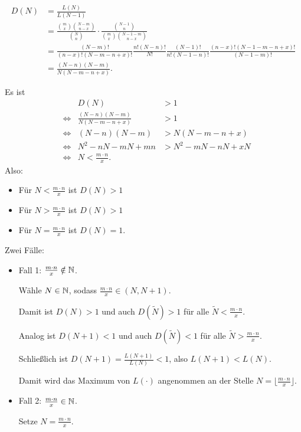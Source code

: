 \documentclass{tstextbook}
\begin{document}
\begin{example}
	\[
	\begin{aligned}
		D(N) & = \frac{L(N)}{L(N-1)} \\
		& = \frac{\binom{m}{x}\binom{N-m}{n-x}}{\binom{N}{n}} \cdot \frac{\binom{N-1}{n}}{\binom{m}{x}\binom{N-1-m}{n-x}} \\
		& = \frac{(N-m)!}{(n-x)!(N-m-n+x)!}\frac{n!(N-n)!}{N!}\frac{(N-1)!}{n!(N-1-n)!}\frac{(n-x)!(N-1-m-n+x)!}{(N-1-m)!} \\
		& = \frac{(N-n)(N-m)}{N(N-m-n+x)}.
	\end{aligned}
	\]
	
	Es ist 
	\[
	\begin{aligned}
		&& D(N) & > 1 \\
		& \Leftrightarrow & \frac{(N-n)(N-m)}{N(N-m-n+x)} & > 1 \\
		& \Leftrightarrow & (N-n)(N-m) & > N(N-m-n+x) \\
		& \Leftrightarrow & N^2-nN-mN+mn & > N^2-mN-nN+xN \\
		& \Leftrightarrow & N < \frac{m\cdot n}{x}.
	\end{aligned}
	\]
	Also: 
	\begin{itemize}
		\item Für $ N < \frac{m\cdot n}{x} $ ist $ D(N) > 1 $
		\item Für $ N > \frac{m\cdot n}{x} $ ist $ D(N) > 1 $
		\item Für $ N = \frac{m\cdot n}{x} $ ist $ D(N) = 1 $.
	\end{itemize}

Zwei Fälle:
	\begin{itemize}
		\item Fall 1: 
		$ \frac{m\cdot n}{x}\notin \mathbb N $. 
		
		Wähle $ N \in \mathbb N $, sodass $ \frac{m\cdot n}{x} \in (N, N+1) $. 
		
		Damit ist $ D(N) > 1 $ und auch $ D(\tilde{N}) > 1 $ für alle $ \tilde{N} < \frac{m\cdot n}{x} $. 
		
		Analog ist $ D(N+1) < 1 $ und auch $ D(\tilde{N}) < 1 $ für alle $ \tilde{N} > \frac{m\cdot n}{x} $.
		
		Schließlich ist $ D(N+1) = \frac{L(N+1)}{L(N)} < 1 $, also $ L(N+1) < L(N) $. 
		
		Damit wird das Maximum von $ L(\cdot) $ angenommen an der Stelle $ N = \lfloor\frac{m\cdot n}{x}\rfloor $.
		\item Fall 2: 
		$ \frac{m\cdot n}{x} \in \mathbb N $. 
		
		Setze $ N = \frac{m\cdot n}{x} $.
		

\end{itemize}
\end{example}
\end{document}
